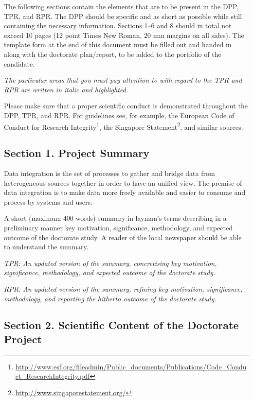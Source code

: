 \documentclass[12pt]{article}
\begin{document}
The following sections contain the elements that are to be present in the DPP, TPR, and RPR. The DPP should be specific and as short as possible while still containing the necessary information. Sections 1--6 and 8 should in total not exceed 10 pages (12 point Times New Roman, 20 mm margins on all sides).
The template form at the end of this document must be filled out and handed in along with the doctorate plan/report, to be added to the portfolio of the candidate.
\begin{shaded}
\noindent
\emph{The particular areas that you must pay attention to with regard to the TPR and RPR are written in italic and highlighted.}
\end{shaded}

Please make sure that a proper scientific conduct is demonstrated throughout the DPP, TPR, and RPR. For guidelines see, for example, the European Code of Conduct for Research Integrity\footnote{\url{http://www.esf.org/fileadmin/Public_documents/Publications/Code_Conduct_ResearchIntegrity.pdf}}, the Singapore Statement\footnote{\url{http://www.singaporestatement.org/}}, and similar sources.

\subsection*{Section 1. Project Summary}
Data integration is the set of processes to gather and bridge data from heterogeneous sources together in order to have an unified view. The premise of data integration is to make data more freely available and easier to consume and process by systems and users. 



A short (maximum 400 words) summary in layman's terms describing in a preliminary manner key motivation, significance, methodology, and expected outcome of the doctorate study. A reader of the local newspaper should be able to understand the summary.

\begin{shaded}
\noindent
\emph{TPR: An updated version of the summary, concretising key motivation, significance, methodology, and expected outcome of the doctorate study.}

\noindent
\emph{RPR: An updated version of the summary, refining key motivation, significance, methodology, and reporting the hitherto outcome of the doctorate study.}
\end{shaded}

\subsection*{Section 2. Scientific Content of the Doctorate Project}
\end{document}
